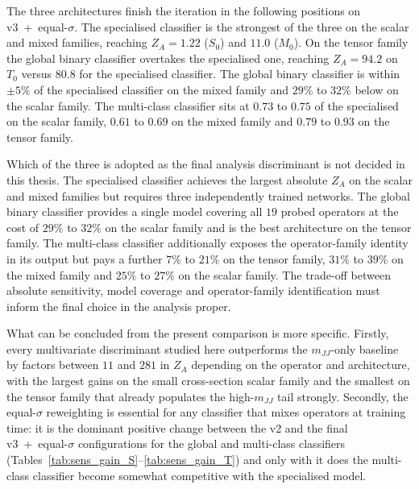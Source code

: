 The three architectures finish the iteration in the following positions on v3~+~equal-$\sigma$. The specialised classifier is the strongest of the three on the scalar and mixed families, reaching $Z_A=1.22$ ($S_0$) and $11.0$ ($M_0$). On the tensor family the global binary classifier overtakes the specialised one, reaching $Z_A=94.2$ on $T_0$ versus $80.8$ for the specialised classifier. The global binary classifier is within $\pm 5\%$ of the specialised classifier on the mixed family and $29\%$ to $32\%$ below on the scalar family. The multi-class classifier sits at $0.73$ to $0.75$ of the specialised on the scalar family, $0.61$ to $0.69$ on the mixed family and $0.79$ to $0.93$ on the tensor family.

Which of the three is adopted as the final analysis discriminant is not decided in this thesis. The specialised classifier achieves the largest absolute $Z_A$ on the scalar and mixed families but requires three independently trained networks. The global binary classifier provides a single model covering all $19$ probed operators at the cost of $29\%$ to $32\%$ on the scalar family and is the best architecture on the tensor family. The multi-class classifier additionally exposes the operator-family identity in its output but pays a further $7\%$ to $21\%$ on the tensor family, $31\%$ to $39\%$ on the mixed family and $25\%$ to $27\%$ on the scalar family. The trade-off between absolute sensitivity, model coverage and operator-family identification must inform the final choice in the analysis proper.

What can be concluded from the present comparison is more specific. Firstly, every multivariate discriminant studied here outperforms the $m_{JJ}$-only baseline by factors between $11$ and $281$ in $Z_A$ depending on the operator and architecture, with the largest gains on the small cross-section scalar family and the smallest on the tensor family that already populates the high-$m_{JJ}$ tail strongly. Secondly, the equal-$\sigma$ reweighting is essential for any classifier that mixes operators at training time: it is the dominant positive change between the v2 and the final v3~+~equal-$\sigma$ configurations for the global and multi-class classifiers (Tables~\ref{tab:sens_gain_S}--\ref{tab:sens_gain_T}) and only with it does the multi-class classifier become somewhat competitive with the specialised model. 
